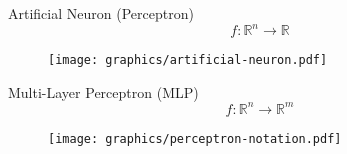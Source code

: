 \documentclass{beamer}
\begin{document}
\begin{frame}{Artificial Neuron (Perceptron)}
    $$f: \mathbb{R}^n \rightarrow \mathbb{R}$$
    \begin{figure}[ht]
        \centering
        \texttt{[image: graphics/artificial-neuron.pdf]}
    \end{figure}
\end{frame}

\begin{frame}{Multi-Layer Perceptron (MLP)}
    $$f: \mathbb{R}^n \rightarrow \mathbb{R}^m$$
    \begin{figure}[ht]
        \centering
        \texttt{[image: graphics/perceptron-notation.pdf]}
    \end{figure}
\end{frame}
\end{document}
